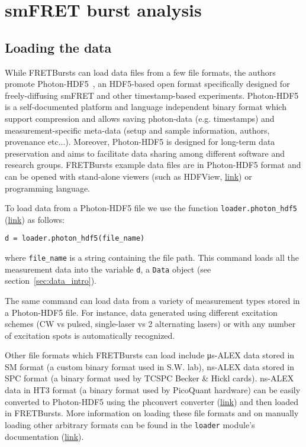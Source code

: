 \section{smFRET burst analysis}
\label{sec:analysis}

\subsection{Loading the data}
\label{sec:dataload}
While FRETBursts can load data files from a few file formats,
the authors promote Photon-HDF5~\cite{Ingargiola2016},
an HDF5-based open format specifically designed for freely-diffusing smFRET and other timestamp-based experiments.
Photon-HDF5 is a self-documented platform and language independent binary format
which support compression and allows saving photon-data (e.g. timestamps) and measurement-specific meta-data
(setup and sample information, authors, provenance etc...).
Moreover, Photon-HDF5 is designed for long-term data preservation and aims to facilitate data sharing
among different software and research groups.
FRETBursts example data files are in Photon-HDF5 format and can be opened with
stand-alone viewers (such as HDFView, \href{http://www.hdfgroup.org/products/java/hdfview/}{link}) or 
programming language.

To load data from a Photon-HDF5 file we use the function \verb|loader.photon_hdf5|
(\href{http://fretbursts.readthedocs.org/en/latest/loader.html#fretbursts.loader.photon_hdf5}{link})
as follows:

\begin{lstlisting}
d = loader.photon_hdf5(file_name)
\end{lstlisting}

\noindent
where \verb|file_name| is a string containing the file path.
This command loads all the measurement data into the variable \verb|d|, 
a \verb|Data| object (see section~\ref{sec:data_intro}).

The same command can load data from a variety of measurement types stored
in a Photon-HDF5 file. For instance, data generated using different excitation schemes
(CW vs pulsed, single-laser vs 2 alternating lasers) or with any number of excitation spots
is automatically recognized.

Other file formats which FRETBursts can load include μs-ALEX data stored in SM format
(a custom binary format used in S.W. lab),
ns-ALEX data stored in SPC format (a binary format used by TCSPC Becker \& Hickl cards).
ns-ALEX data in HT3 format (a binary format used by PicoQuant hardware)
can be easily converted to Photon-HDF5 using the phconvert converter
(\href{http://photon-hdf5.github.io/phconvert/}{link})
and then loaded in FRETBursts.
More information on loading these file formats and on manually loading other arbitrary formats
can be found in the \verb|loader| module's documentation
(\href{http://fretbursts.readthedocs.org/en/latest/loader.html}{link}).

